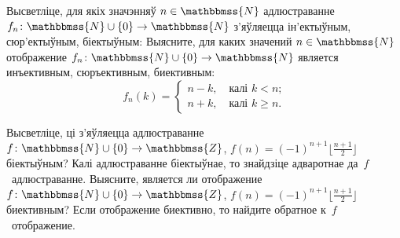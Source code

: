 \documentclass[12pt, a4paper]{article}
\begin{document}
\begin{problemList}
\bigskip

\problemItemWithCommonPart
{Высветліце, для якіх значэнняў $n \in \mathbbmss{N}$ адлюстраванне
$f_n \colon \mathbbmss{N} \cup \{0\} \to \mathbbmss{N}$ з'яўляецца ін'ектыўным, сюр'ектыўным, біектыўным:}
{Выясните, для каких значений $n \in \mathbbmss{N}$ отображение
$f_n \colon \mathbbmss{N} \cup \{0\} \to \mathbbmss{N}$ является инъективным, сюръективным, биективным:}
{%
\begin{equation*}
    f_n(k) =
    \begin{cases}
    n - k, \quad \text{калі $k < n$;} \\
    n + k, \quad \text{калі $k \ge n$.}
    \end{cases}
\end{equation*}
}

\medskip

\problemItemSimple
{Высветліце, ці з'яўляецца адлюстраванне
$f \colon \mathbbmss{N} \cup \{0\} \to \mathbbmss{Z}$, $f(n) = (-1)^{n + 1}\bigl\lfloor\frac{n + 1}{2}\bigr\rfloor$
біектыўным? Калі адлюстраванне біектыўнае, то знайдзіце адваротнае да~$f$~адлюстраванне.}
{Выясните, является ли отображение
$f \colon \mathbbmss{N} \cup \{0\} \to \mathbbmss{Z}$, $f(n) = (-1)^{n + 1}\bigl\lfloor\frac{n + 1}{2}\bigr\rfloor$
биективным? Если отображение биективно, то найдите обратное к~$f$~отображение.}

\bigskip


\end{problemList}
\end{document}
